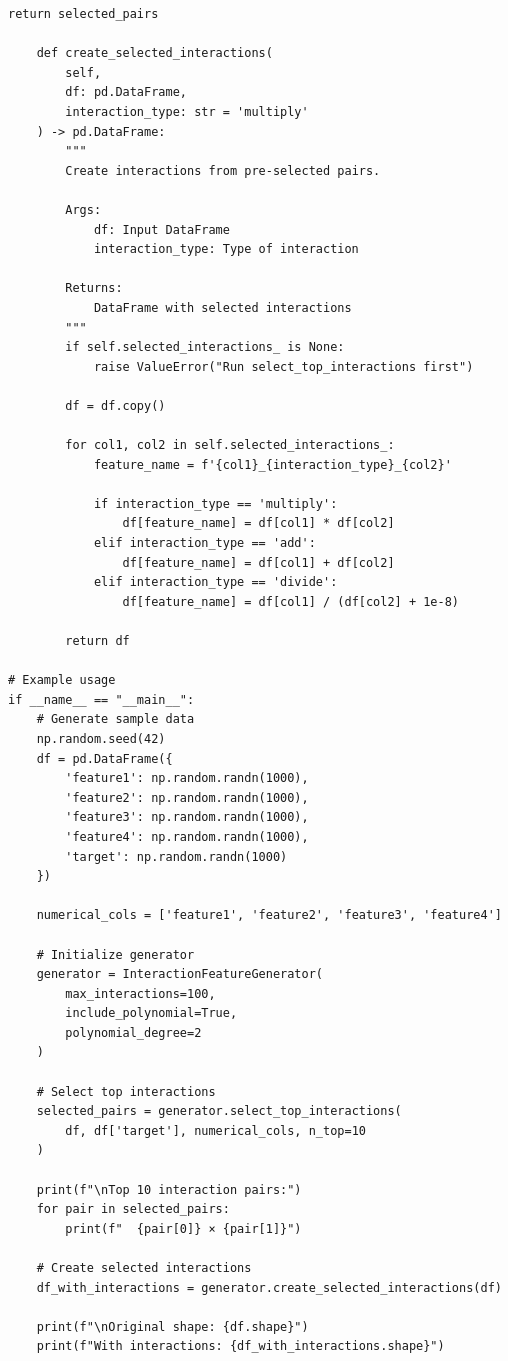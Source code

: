 \begin{lstlisting}[style=python, caption={Intelligent Feature Interaction Generation}]
        return selected_pairs

    def create_selected_interactions(
        self,
        df: pd.DataFrame,
        interaction_type: str = 'multiply'
    ) -> pd.DataFrame:
        """
        Create interactions from pre-selected pairs.

        Args:
            df: Input DataFrame
            interaction_type: Type of interaction

        Returns:
            DataFrame with selected interactions
        """
        if self.selected_interactions_ is None:
            raise ValueError("Run select_top_interactions first")

        df = df.copy()

        for col1, col2 in self.selected_interactions_:
            feature_name = f'{col1}_{interaction_type}_{col2}'

            if interaction_type == 'multiply':
                df[feature_name] = df[col1] * df[col2]
            elif interaction_type == 'add':
                df[feature_name] = df[col1] + df[col2]
            elif interaction_type == 'divide':
                df[feature_name] = df[col1] / (df[col2] + 1e-8)

        return df

# Example usage
if __name__ == "__main__":
    # Generate sample data
    np.random.seed(42)
    df = pd.DataFrame({
        'feature1': np.random.randn(1000),
        'feature2': np.random.randn(1000),
        'feature3': np.random.randn(1000),
        'feature4': np.random.randn(1000),
        'target': np.random.randn(1000)
    })

    numerical_cols = ['feature1', 'feature2', 'feature3', 'feature4']

    # Initialize generator
    generator = InteractionFeatureGenerator(
        max_interactions=100,
        include_polynomial=True,
        polynomial_degree=2
    )

    # Select top interactions
    selected_pairs = generator.select_top_interactions(
        df, df['target'], numerical_cols, n_top=10
    )

    print(f"\nTop 10 interaction pairs:")
    for pair in selected_pairs:
        print(f"  {pair[0]} × {pair[1]}")

    # Create selected interactions
    df_with_interactions = generator.create_selected_interactions(df)

    print(f"\nOriginal shape: {df.shape}")
    print(f"With interactions: {df_with_interactions.shape}")
\end{lstlisting}

